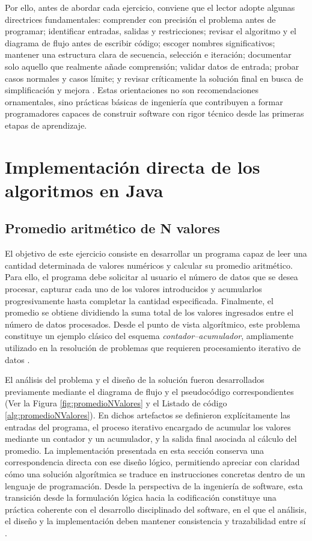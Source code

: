 \documentclass[12pt,twoside]{book}
\begin{document}
			Por ello, antes de abordar cada ejercicio, conviene que el lector adopte algunas directrices fundamentales: comprender con precisión el problema antes de programar; identificar entradas, salidas y restricciones; revisar el algoritmo y el diagrama de flujo antes de escribir código; escoger nombres significativos; mantener una estructura clara de secuencia, selección e iteración; documentar solo aquello que realmente añade comprensión; validar datos de entrada; probar casos normales y casos límite; y revisar críticamente la solución final en busca de simplificación y mejora \cite{Martin2008Clean,Pressman2019Software,Sommerville2015Software,SWEBOK2025Guide}. Estas orientaciones no son recomendaciones ornamentales, sino prácticas básicas de ingeniería que contribuyen a formar programadores capaces de construir software con rigor técnico desde las primeras etapas de aprendizaje.
		
			\section{Implementación directa de los algoritmos en Java}
			
				\subsection{Promedio aritmético de N valores}
				\noindent
					El objetivo de este ejercicio consiste en desarrollar un programa capaz de leer una cantidad determinada de valores numéricos y calcular su promedio aritmético. Para ello, el programa debe solicitar al usuario el número de datos que se desea procesar, capturar cada uno de los valores introducidos y acumularlos progresivamente hasta completar la cantidad especificada. Finalmente, el promedio se obtiene dividiendo la suma total de los valores ingresados entre el número de datos procesados. Desde el punto de vista algorítmico, este problema constituye un ejemplo clásico del esquema \emph{contador--acumulador}, ampliamente utilizado en la resolución de problemas que requieren procesamiento iterativo de datos \cite{Futschek2006Algorithmic,Pressman2019Software}.
					
					El análisis del problema y el diseño de la solución fueron desarrollados previamente mediante el diagrama de flujo y el pseudocódigo correspondientes (Ver la Figura \ref{fig:promedioNValores} y el Listado de código \ref{alg:promedioNValores}). En dichos artefactos se definieron explícitamente las entradas del programa, el proceso iterativo encargado de acumular los valores mediante un contador y un acumulador, y la salida final asociada al cálculo del promedio. La implementación presentada en esta sección conserva una correspondencia directa con ese diseño lógico, permitiendo apreciar con claridad cómo una solución algorítmica se traduce en instrucciones concretas dentro de un lenguaje de programación. Desde la perspectiva de la ingeniería de software, esta transición desde la formulación lógica hacia la codificación constituye una práctica coherente con el desarrollo disciplinado del software, en el que el análisis, el diseño y la implementación deben mantener consistencia y trazabilidad entre sí \cite{Pressman2019Software,Sommerville2015Software}.
					
\end{document}
